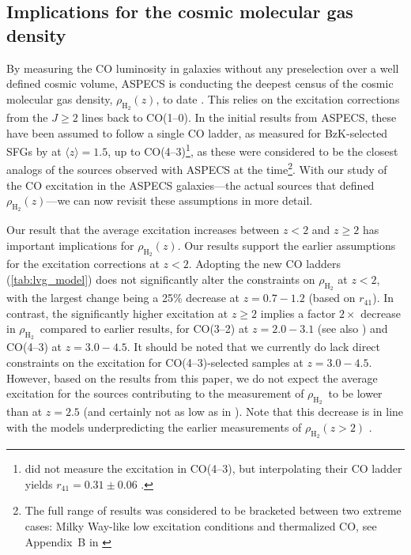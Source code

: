 \documentclass[twocolumn]{aastex62}
\newcommand{\HH}{\ensuremath{\mathrm{H}_{2}}}
\newcommand{\rhoHH}{\ensuremath{\rho_{\HH}}}
\newcommand{\avg}[1]{\ensuremath{\langle #1 \rangle}}
\begin{document}
\subsection{Implications for the cosmic molecular gas density}
\label{sec:impl-cosm-molec}
By measuring the CO luminosity in galaxies without any preselection over a well
defined cosmic volume, ASPECS is conducting the deepest census of the cosmic
molecular gas density, $\rhoHH(z)$, to date \citep{Decarli2016a, Decarli2019,
  Decarli2020}.  This relies on the excitation corrections from the $J\ge2$
lines back to CO(1--0).  In the initial results from ASPECS, these have been
assumed to follow a single CO ladder, as measured for BzK-selected SFGs by
\cite{Daddi2015} at $\avg{z}=1.5$, up to CO(4--3)\footnote{\cite{Daddi2015} did
  not measure the excitation in CO(4--3), but interpolating their CO ladder
  yields $r_{41}=0.31 \pm 0.06$ \citep[see][]{Decarli2016b}.}, as these were
considered to be the closest analogs of the sources observed with ASPECS at the
time\footnote{The full range of results was considered to be bracketed between
  two extreme cases: Milky Way-like low excitation conditions and thermalized
  CO, see Appendix~B in \cite{Decarli2019}}.  With our study of the CO
excitation in the ASPECS galaxies---the actual sources that defined
$\rhoHH(z)$---we can now revisit these assumptions in more detail.

Our result that the average excitation increases between $z<2$ and $z\ge2$ has
important implications for $\rhoHH(z)$.  Our results support the earlier
assumptions for the excitation corrections at $z<2$.  Adopting the new CO
ladders (\autoref{tab:lvg_model}) does not significantly alter the constraints
on $\rhoHH$ at $z<2$, with the largest change being a 25\% decrease at
$z=0.7-1.2$ (based on $r_{41}$).  In contrast, the significantly higher
excitation at $z\ge2$ implies a factor $2\times$ decrease in \rhoHH\, compared
to earlier results, for CO(3--2) at $z=2.0-3.1$ (see also
\citealt{Riechers2020b}) and CO(4--3) at $z=3.0-4.5$.  It should be noted that
we currently do lack direct constraints on the excitation for CO(4--3)-selected
samples at $z=3.0-4.5$.  However, based on the results from this paper, we do
not expect the average excitation for the sources contributing to the
measurement of \rhoHH\ to be lower than at $z=2.5$ (and certainly not as low as
in \citealt{Daddi2015}).  Note that this decrease is in line with the models
underpredicting the earlier measurements of $\rhoHH(z>2)$
\citep[e.g.,][]{Popping2019}.
\end{document}
